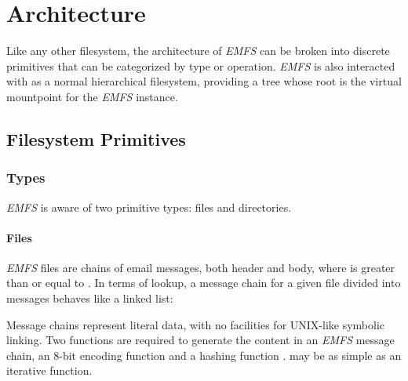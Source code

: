 \documentclass[12pt]{article}
\begin{document}
\section{Architecture}

Like any other filesystem, the architecture of \textit{EMFS} can be broken into
discrete primitives that can be categorized by type or operation.
\textit{EMFS} is also interacted with as a normal hierarchical filesystem,
providing a tree whose root is the virtual mountpoint for the \textit{EMFS}
instance.

\subsection{Filesystem Primitives}

\subsubsection{Types}

\textit{EMFS} is aware of two primitive types: files and directories.

\paragraph{Files}

\textit{EMFS} files are chains of  email messages, both header and body,
where  is greater than or equal to . In terms of lookup, a message chain
for a given file  divided into  messages behaves like a linked list:


Message chains represent literal data, with no facilities for UNIX-like
symbolic linking. Two functions are required to generate the content in an
\textit{EMFS} message chain, an 8-bit encoding function  and a
hashing function .  may be as simple as an
iterative function.
\end{document}

